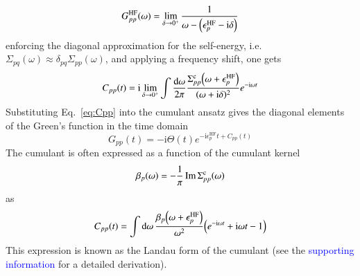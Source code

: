 \documentclass[aip,jcp,reprint,noshowkeys,superscriptaddress]{revtex4-2}
\newcommand{\HF}{\text{HF}}
\newcommand{\co}{\text{c}}
\newcommand{\eps}{\epsilon}
\newcommand{\Sig}{\Sigma}
\newcommand{\ii}{\mathrm{i}}
\newcommand{\SupMat}{\textcolor{blue}{supporting information}\xspace}
\begin{document}
\begin{equation} \label{eq:GppHF}
	G_{pp}^\HF(\omega) = \lim_{\delta\to0^+}  \frac{1}{\omega - \qty(\eps_p^\HF - \ii \delta)}
\end{equation}
enforcing the diagonal approximation for the self-energy, i.e.~$\Sig_{pq}(\omega) \approx \delta_{pq} \Sig_{pp}(\omega)$, and applying a frequency shift, one gets
\begin{equation} \label{eq:Cpp}
	C_{pp}(t) = \ii \lim_{\delta\to0^+} \int \frac{\dd{\omega}}{2\pi} \frac{ \Sig_{pp}^\co\qty(\omega+\eps_p^\HF)}{(\omega + \ii \delta)^2} e^{-\ii \omega t}
\end{equation}
Substituting Eq.~\eqref{eq:Cpp} into the cumulant ansatz gives the diagonal elements of the Green's function in the time domain
\begin{equation} \label{eq:Gpp}
	G_{pp}(t) = - \ii \Theta(t) e^{-\ii \eps_p^\HF t + C_{pp}(t)} 
\end{equation}
The cumulant is often expressed as a function of the cumulant kernel
\begin{equation}
	\beta_p(\omega) = - \frac{1}{\pi} \Im\Sig^\co_{pp}\qty(\omega)
\end{equation}
as
\begin{equation}
	C_{pp}(t) 
	= 
	\int \dd{\omega} \frac{\beta_p\qty(\omega+\eps_p^\HF)}{\omega^2} \qty( e^{-\ii \omega t} + \ii \omega t - 1 )	
\end{equation}
This expression is known as the Landau form of the cumulant (see the \SupMat for a detailed derivation). \cite{Landau_1965}

\end{document}
